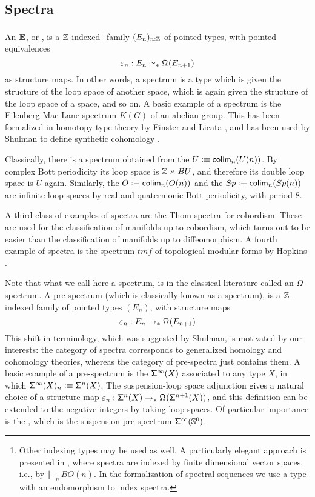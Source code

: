 \documentclass[reqno]{amsart}
\begin{document}
\subsection{Spectra}
An  $\spectrum{E}$, or , is a $\Z$-indexed\footnote{Other indexing types may be used as well. A particularly elegant approach is presented in \cite{Kochman96}, where spectra are indexed by finite dimensional vector spaces, i.e., by $\bigsqcup_n BO(n)$. In the formalization of spectral sequences we use a type with an endomorphism to index spectra.} family
$(E_n)_{n:\Z}$ of pointed types, with pointed equivalences
\begin{equation*}
\varepsilon_n : \ptdeqv{E_n}{\loopspace{E_{n+1}}} 
\end{equation*}
as structure maps. In other words, a spectrum is a type which is given the structure of the loop space
of another space, which is again given the structure of the loop space of a space,
and so on. A basic example of a spectrum is the Eilenberg-Mac Lane spectrum
$K(G)$ of an abelian group. This has been formalized in homotopy type theory
by Finster and Licata \cite{FinsterLicata}, and has been used by Shulman to 
define synthetic cohomology \cite{Shulman13Cohomology}. 

Classically, there is a spectrum obtained from the  $U\defeq\colim_n(U(n))$. By complex Bott periodicity its loop space is $\Z\times BU$, and therefore its double loop space is $U$ again. Similarly, the  $O\defeq\colim_n(O(n))$ and the  $Sp\defeq\colim_n(Sp(n))$ are infinite loop spaces by real and quaternionic Bott periodicity, with period $8$.

A third class of examples of spectra are the Thom spectra for cobordism.
These are used for the classification of manifolds up to cobordism, which turns
out to be easier than the classification of manifolds up to diffeomorphism.
A fourth example of spectra is the spectrum $tmf$ of topological modular forms
by Hopkins \cite{Hopkins02}.

Note that what we call here a spectrum, is in the classical literature called
an $\Omega$-spectrum. A pre-spectrum (which is classically known as a spectrum),
is a $\Z$-indexed family of pointed types $(E_n)$, with structure maps
\begin{equation*}
\varepsilon_n : E_n\to_\ast\loopspace{E_{n+1}}
\end{equation*}
This shift in terminology, which was suggested by Shulman, is motivated by our 
interests: the category of spectra corresponds to generalized homology and cohomology theories, whereas the category of pre-spectra just contains them.
A basic example of a pre-spectrum is the 
$\suspspec(X)$ associated to any type $X$, in which $\suspspec(X)_n\defeq
\susp[n](X)$. The suspension-loop space adjunction gives a natural choice of
a structure map $\varepsilon_n:\susp[n](X)\to_\ast\loopspace{\susp[n+1](X)}$, and
this definition can be extended to the negative integers by taking loop spaces. 
Of particular importance is the , which is the
suspension pre-spectrum $\suspspec(\sphere{0})$. 
\end{document}
